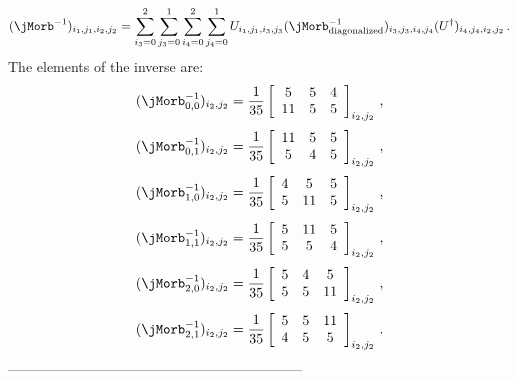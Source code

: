 \begin{description}
{\[
(\jMorb^{-1})_{i_1,j_1,i_2,j_2} =
\sum_{i_3=0}^2 \sum_{j_3=0}^1 \sum_{i_4=0}^2 \sum_{j_4=0}^1 U_{i_1,j_1,i_3,j_3} (\jMorb_{\mathrm{diagonalized}}^{-1})_{i_3,j_3,i_4,j_4} (U^\dagger)_{i_4,j_4,i_2,j_2} \, .
\]
The elements of the inverse {\jacobianOrb} are:
\[
(\jMorb^{-1}_{0,0})_{i_2, j_2} = \frac{1}{35}
 \left[
 \begin{array}{ccc}
 5 & 5 & 4 \\
 11 & 5 & 5
 \end{array}
 \right]_{i_2, j_2} \, ,
\]
\[
(\jMorb^{-1}_{0,1})_{i_2, j_2} = \frac{1}{35}
 \left[
 \begin{array}{ccc}
 11 & 5 & 5 \\
 5 & 4 & 5
 \end{array}
 \right]_{i_2, j_2} \, ,
\]
\[
(\jMorb^{-1}_{1,0})_{i_2, j_2} = \frac{1}{35}
 \left[
 \begin{array}{ccc}
 4 & 5 & 5 \\
 5 & 11 & 5
 \end{array}
 \right]_{i_2, j_2} \, ,
\]
\[
(\jMorb^{-1}_{1,1})_{i_2, j_2} = \frac{1}{35}
 \left[
 \begin{array}{ccc}
 5 & 11 & 5 \\
 5 & 5 & 4
 \end{array}
 \right]_{i_2, j_2} \, ,
\]
\[
(\jMorb^{-1}_{2,0})_{i_2, j_2} = \frac{1}{35}
 \left[
 \begin{array}{ccc}
 5 & 4 & 5 \\
 5 & 5 & 11
 \end{array}
 \right]_{i_2, j_2} \, ,
\]
\[
(\jMorb^{-1}_{2,1})_{i_2, j_2} = \frac{1}{35}
 \left[
 \begin{array}{ccc}
 5 & 5 & 11 \\
 4 & 5 & 5
 \end{array}
 \right]_{i_2, j_2} \, .
\]
---------------------------------------------------------------

    }

\end{description}
